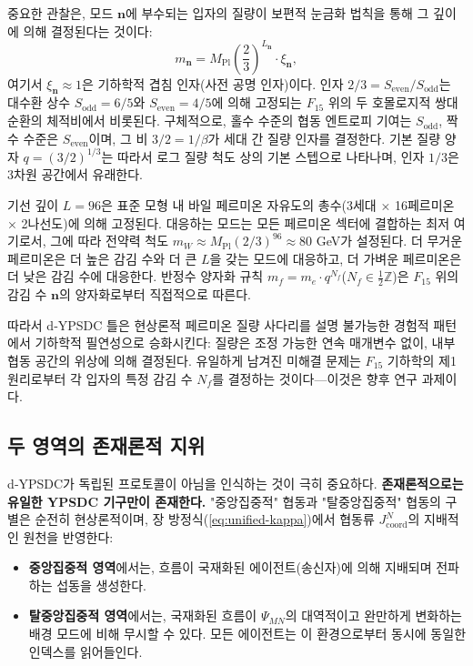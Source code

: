 \documentclass[12pt,a4paper]{article}
\begin{document}
	중요한 관찰은, 모드 \(\mathbf{n}\)에 부수되는 입자의 질량이 보편적 눈금화 법칙을 통해 그 깊이에 의해 결정된다는 것이다:
	\begin{equation}
		m_{\mathbf{n}} = M_{\mathrm{Pl}} \left( \frac{2}{3} \right)^{L_{\mathbf{n}}} \cdot \xi_{\mathbf{n}},
		\label{eq:mass-L}
	\end{equation}
	여기서 \(\xi_{\mathbf{n}} \approx 1\)은 기하학적 겹침 인자(사전 공명 인자)이다. 인자 \(2/3 = S_{\mathrm{even}}/S_{\mathrm{odd}}\)는 대수환 상수 \(S_{\mathrm{odd}}=6/5\)와 \(S_{\mathrm{even}}=4/5\)에 의해 고정되는 \(F_{15}\) 위의 두 호몰로지적 쌍대 순환의 체적비에서 비롯된다. 구체적으로, 홀수 수준의 협동 엔트로피 기여는 \(S_{\mathrm{odd}}\), 짝수 수준은 \(S_{\mathrm{even}}\)이며, 그 비 \(3/2 = 1/\beta\)가 세대 간 질량 인자를 결정한다. 기본 질량 양자 \(q = (3/2)^{1/3}\)는 따라서 로그 질량 척도 상의 기본 스텝으로 나타나며, 인자 \(1/3\)은 3차원 공간에서 유래한다.
	
	기선 깊이 \(L=96\)은 표준 모형 내 바일 페르미온 자유도의 총수(3세대 × 16페르미온 × 2나선도)에 의해 고정된다. 대응하는 모드는 모든 페르미온 섹터에 결합하는 최저 여기로서, 그에 따라 전약력 척도 \(m_W \approx M_{\mathrm{Pl}} (2/3)^{96} \approx 80\) GeV가 설정된다. 더 무거운 페르미온은 더 높은 감김 수와 더 큰 \(L\)을 갖는 모드에 대응하고, 더 가벼운 페르미온은 더 낮은 감김 수에 대응한다. 반정수 양자화 규칙 \(m_f = m_e \cdot q^{N_f}\)(\(N_f \in \frac{1}{2}\mathbb{Z}\))은 \(F_{15}\) 위의 감김 수 \(\mathbf{n}\)의 양자화로부터 직접적으로 따른다.
	
	따라서 d‑YPSDC 틀은 현상론적 페르미온 질량 사다리를 설명 불가능한 경험적 패턴에서 기하학적 필연성으로 승화시킨다: 질량은 조정 가능한 연속 매개변수 없이, 내부 협동 공간의 위상에 의해 결정된다. 유일하게 남겨진 미해결 문제는 \(F_{15}\) 기하학의 제1원리로부터 각 입자의 특정 감김 수 \(N_f\)를 결정하는 것이다—이것은 향후 연구 과제이다.
	
	\subsection{두 영역의 존재론적 지위}
	\label{subsec:ontological-status}
	
	d‑YPSDC가 독립된 프로토콜이 아님을 인식하는 것이 극히 중요하다.
	\textbf{존재론적으로는 유일한 YPSDC 기구만이 존재한다.} "중앙집중적" 협동과 "탈중앙집중적" 협동의 구별은 순전히 현상론적이며, 장 방정식(\ref{eq:unified-kappa})에서 협동류 \(J^{N}_{\mathrm{coord}}\)의 지배적인 원천을 반영한다:
	
	\begin{itemize}[leftmargin=*]
		\item \textbf{중앙집중적 영역}에서는, 흐름이 국재화된 에이전트(송신자)에 의해 지배되며 전파하는 섭동을 생성한다.
		\item \textbf{탈중앙집중적 영역}에서는, 국재화된 흐름이 \(\Psi_{MN}\)의 대역적이고 완만하게 변화하는 배경 모드에 비해 무시할 수 있다. 모든 에이전트는 이 환경으로부터 동시에 동일한 인덱스를 읽어들인다.
	\end{itemize}
	
\end{document}
